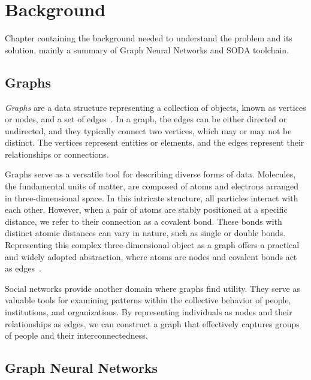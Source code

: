 \documentclass{Configuration_Files/PoliMi3i_thesis}
\begin{document}
    \chapter{Background}
    \label{ch:chapter_two}%

    Chapter containing the background needed to understand the problem and its solution, mainly a summary
    of Graph Neural Networks and SODA toolchain.

    \section{Graphs}
    \label{sh:graphs}%

    \textit{Graphs} are a data structure representing a collection of objects, known as vertices or nodes, and a set of edges~\cite{DBLP:journals/corr/abs-1812-08434}.
    In a graph, the edges can be either directed or undirected, and they typically connect two vertices, which may or may not be distinct.
    The vertices represent entities or elements, and the edges represent their relationships or connections.

    Graphs serve as a versatile tool for describing diverse forms of data.
    Molecules, the fundamental units of matter, are composed of atoms and electrons arranged in three-dimensional space.
    In this intricate structure, all particles interact with each other.
    However, when a pair of atoms are stably positioned at a specific distance, we refer to their connection as a covalent bond.
    These bonds with distinct atomic distances can vary in nature, such as single or double bonds.
    Representing this complex three-dimensional object as a graph offers a practical and widely adopted abstraction, where atoms are nodes and covalent bonds act as edges~\cite{DBLP:journals/corr/DuvenaudMAGHAA15}.

    Social networks provide another domain where graphs find utility.
    They serve as valuable tools for examining patterns within the collective behavior of people, institutions, and organizations.
    By representing individuals as nodes and their relationships as edges, we can construct a graph that effectively captures groups of people and their interconnectedness.

    \section{Graph Neural Networks}
    \label{sh:graph_neural_networks}%
\end{document}
